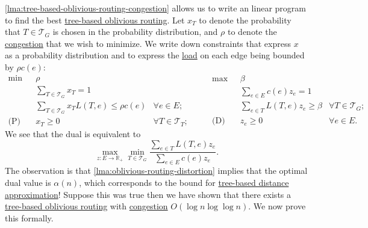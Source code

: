 \autoref{lma:tree-based-oblivious-routing-congestion} allows us to write an linear program to find the best \hyperref[not:tree-based-oblivious-routing]{tree-based oblivious routing}. Let \(x_T\) to denote the probability that \(T \in \mathcal{T} _G\) is chosen in the probability distribution, and \(\rho \) to denote the \hyperref[def:congestion-of-oblivious-routing]{congestion} that we wish to minimize. We write down constraints that express \(x\) as a probability distribution and to express the \hyperref[def:expected-load]{load} on each edge being bounded by \(\rho c(e)\):
\[
	\begin{aligned}
		\min~           & \rho                                                                                  \\
		                & \sum_{T \in \mathcal{T} _G} x_T = 1                                                   \\
		                & \sum_{T \in\mathcal{T} _G} x_T L(T, e) \leq \rho c(e) & \forall e \in E ;             \\
		\text{(P)}\quad & x_T \geq 0                                            & \forall T \in \mathcal{T} _T;
	\end{aligned}\qquad
	\begin{aligned}
		\max~           & \beta                                                                  \\
		                & \sum_{e \in E} c(e) z_e = 1                                            \\
		                & \sum_{e \in T} L(T, e) z_e \geq \beta & \forall T \in \mathcal{T} _G ; \\
		\text{(D)}\quad & z_e \geq 0                            & \forall e \in E.
	\end{aligned}
\]
We see that the dual is equivalent to
\begin{equation}\label{eq:tree-based-oblivious-routing-dual-LP-equivalent}
	\max _{z \colon E \to \mathbb{R} _{+}} \min _{T \in \mathcal{T} _G} \frac{\sum_{e \in T} L(T, e) z_e}{\sum_{e \in E} c(e) z_e}.
\end{equation}
The observation is that \autoref{lma:oblivious-routing-distortion} implies that the optimal dual value is \(\alpha (n)\), which corresponds to the bound for \hyperref[prb:tree-embedding]{tree-based distance approximation}! Suppose this was true then we have shown that there exists a \hyperref[not:tree-based-oblivious-routing]{tree-based oblivious routing} with \hyperref[def:congestion-of-oblivious-routing]{congestion} \(O(\log n \log \log n)\). We now prove this formally.

